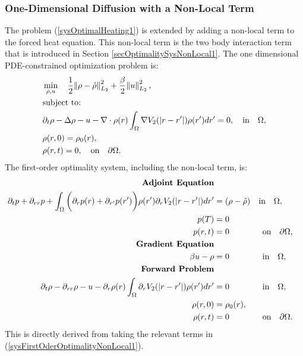 \subsubsection{One-Dimensional Diffusion with a Non-Local Term}\label{secOneDDiffusionNonlocalOptim1}
The problem (\ref{sysOptimalHeating1}) is extended by adding a non-local term to the forced heat equation. This non-local term is the two body interaction term that is introduced in Section \ref{secOptimalitySysNonLocal1}.
The one dimensional PDE-constrained optimization problem is:
\begin{align}
&\min_{\rho,u} \quad \frac{1}{2}\norm{\rho- \hat{\rho}}_{L_2}^2 + \frac{\beta}{2} \norm{u}_{L_2}^2,\\
&\text{subject to:}\notag 
\notag \\
&\partial_t \rho - \Delta \rho - u - \nabla \cdot \rho(r) \int_\Omega \nabla V_2(|r-r'|) \rho(r')dr'=0,  \quad \text{in} \quad \Omega,\notag 
\notag \\
&\rho(r,0)=\rho_0(r),\notag 
\notag \\
& \rho(r,t)=0, \quad \text{on} \quad \partial \Omega. \notag 
\end{align}
The first-order optimality system, including the non-local term, is:
\begin{align}\label{sysoptinonlocandheat1D}
\textbf{Adjoint Equation}  \\
\partial_t  p  + \partial_{rr} p + \int_\Omega \bigg(\partial_r  p(r)+\partial_{r'}  p(r')\bigg) \rho(r') \partial_r V_2(|r-r'|) dr' &=(\rho- \hat{\rho})  \quad \text{in} \quad \Omega, \notag \\
p(T) &= 0 \notag\\
p(r,t) &=0 \quad \quad \quad \quad \text{on}\quad \partial\Omega, \notag\\
\textbf{Gradient Equation} \notag \\
\beta u  - \rho  &=0 \quad\quad\quad\quad \text{in} \quad \Omega, \notag \\
\textbf{Forward Problem} \notag \\
\partial_t \rho - \partial_{rr} \rho-u - \partial_r  \rho(r) \int_\Omega \partial_r V_2(|r-r'|) \rho(r')dr' &=0 \quad\quad\quad\quad \text{in} \quad \Omega, \notag \\ 
\rho(r,0)&=\rho_0(r), \notag \\
\rho(r,t) &=0 \quad\quad\quad \quad \text{on} \quad \partial \Omega. \notag
\end{align}
This is directly derived from taking the relevant terms in (\ref{sysFirstOderOptimalityNonLocal1}).
